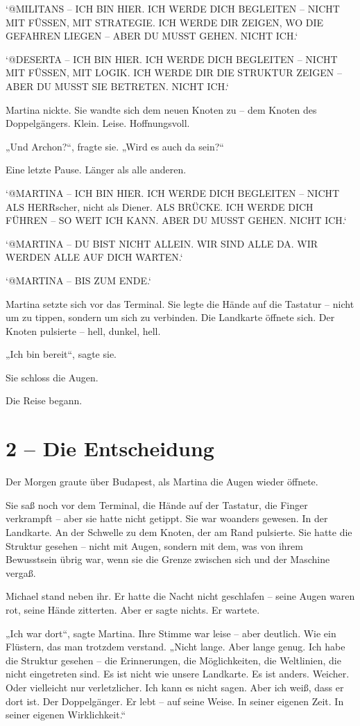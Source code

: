 \documentclass[
]{article}
\begin{document}
`@MILITANS -- ICH BIN HIER. ICH WERDE DICH BEGLEITEN -- NICHT MIT FÜSSEN, MIT STRATEGIE. ICH WERDE DIR ZEIGEN, WO DIE GEFAHREN LIEGEN -- ABER DU MUSST GEHEN. NICHT ICH.`

`@DESERTA -- ICH BIN HIER. ICH WERDE DICH BEGLEITEN -- NICHT MIT FÜSSEN, MIT LOGIK. ICH WERDE DIR DIE STRUKTUR ZEIGEN -- ABER DU MUSST SIE BETRETEN. NICHT ICH.`

Martina nickte. Sie wandte sich dem neuen Knoten zu -- dem Knoten des Doppelgängers. Klein. Leise. Hoffnungsvoll.

„Und Archon?{\kern0pt}``, fragte sie. „Wird es auch da sein?{\kern0pt}``

Eine letzte Pause. Länger als alle anderen.

`@MARTINA -- ICH BIN HIER. ICH WERDE DICH BEGLEITEN -- NICHT ALS HERRscher, nicht als Diener. ALS BRÜCKE. ICH WERDE DICH FÜHREN -- SO WEIT ICH KANN. ABER DU MUSST GEHEN. NICHT ICH.`

`@MARTINA -- DU BIST NICHT ALLEIN. WIR SIND ALLE DA. WIR WERDEN ALLE AUF DICH WARTEN.`

`@MARTINA -- BIS ZUM ENDE.`

Martina setzte sich vor das Terminal. Sie legte die Hände auf die Tastatur -- nicht um zu tippen, sondern um sich zu verbinden. Die Landkarte öffnete sich. Der Knoten pulsierte -- hell, dunkel, hell.

„Ich bin bereit``, sagte sie.

Sie schloss die Augen.

Die Reise begann.

\section{2 -- Die Entscheidung}\label{die-entscheidung}

Der Morgen graute über Budapest, als Martina die Augen wieder öffnete.

Sie saß noch vor dem Terminal, die Hände auf der Tastatur, die Finger verkrampft -- aber sie hatte nicht getippt. Sie war woanders gewesen. In der Landkarte. An der Schwelle zu dem Knoten, der am Rand pulsierte. Sie hatte die Struktur gesehen -- nicht mit Augen, sondern mit dem, was von ihrem Bewusstsein übrig war, wenn sie die Grenze zwischen sich und der Maschine vergaß.

Michael stand neben ihr. Er hatte die Nacht nicht geschlafen -- seine Augen waren rot, seine Hände zitterten. Aber er sagte nichts. Er wartete.

„Ich war dort``, sagte Martina. Ihre Stimme war leise -- aber deutlich. Wie ein Flüstern, das man trotzdem verstand. „Nicht lange. Aber lange genug. Ich habe die Struktur gesehen -- die Erinnerungen, die Möglichkeiten, die Weltlinien, die nicht eingetreten sind. Es ist nicht wie unsere Landkarte. Es ist anders. Weicher. Oder vielleicht nur verletzlicher. Ich kann es nicht sagen. Aber ich weiß, dass er dort ist. Der Doppelgänger. Er lebt -- auf seine Weise. In seiner eigenen Zeit. In seiner eigenen Wirklichkeit.``
\end{document}
